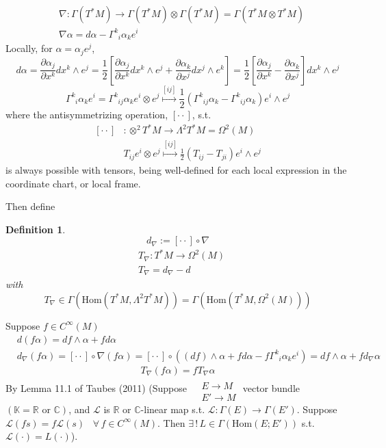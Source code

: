 \documentclass[10pt, twoside]{amsart}
\newtheorem{definition}{Definition}
\begin{document}
\begin{multicols*}{2}
\[
\begin{aligned}
  & \nabla : \Gamma(T^*M) \to \Gamma(T^*M) \otimes \Gamma(T^*M) = \Gamma(T^*M \otimes T^*M) \\
  & \nabla \alpha = d\alpha - \Gamma^k_{ \; \; i } \alpha_k e^i
\end{aligned}
\]
Locally, for $\alpha = \alpha_j e^j$,
\[
d\alpha = \frac{ \partial \alpha_j }{ \partial x^k} dx^k \wedge e^j = \frac{1}{2} \left[ \frac{ \partial \alpha_j}{ \partial x^k} dx^k \wedge e^j + \frac{ \partial \alpha_k}{ \partial x^j} dx^j \wedge e^k \right] = \frac{1}{2} \left[ \frac{ \partial \alpha_j }{ \partial x^k} - \frac{ \partial \alpha_k}{ \partial x^j} \right] dx^k \wedge e^j
\]
\[
\Gamma^k_{ \; \; i} \alpha_k e^i  = \Gamma^k_{ \; \; ij} \alpha_k e^i \otimes e^j \overset{[ij]}{\mapsto} \frac{1}{2} \left( \Gamma^k_{ \; \; ij} \alpha_k - \Gamma^k_{ \; \; ij} \alpha_k \right) e^i \wedge e^j
\]
where the antisymmetrizing operation, $[ \cdot \cdot ]$, s.t.
\[
\begin{aligned}
  [ \cdot \cdot ] & : \otimes^2 T^*M \to \Lambda^2 T^*M = \Omega^2(M) \\
  & T_{ij} e^i \otimes e^j \overset{ [ij]}{\mapsto } \frac{1}{2}(T_{ij} - T_{ji}) e^i \wedge e^j
\end{aligned}
\]
is always possible with tensors, being well-defined for each local expression in the coordinate chart, or local frame.  

Then define
\begin{definition}
  \[
  d_{\nabla} := [ \cdot \cdot ] \circ \nabla
\]
\[
\begin{aligned}
  & T_{\nabla} : T^*M \to \Omega^2(M) \\ 
  & T_{\nabla} = d_{\nabla} - d
\end{aligned}
\]
with 
\[
T_{\nabla} \in \Gamma( \text{Hom}(T^*M, \Lambda^2T^*M)) = \Gamma(\text{Hom}(T^*M, \Omega^2(M) ) )
\]
\end{definition}

Suppose $f\in C^{\infty}(M)$
\[
\begin{aligned}
  & d(f\alpha) = df \wedge \alpha + fd\alpha \\ 
  & d_{\nabla} (f\alpha) = [ \cdot \cdot ]\circ \nabla (f\alpha) = [ \cdot \cdot ]\circ ((df) \wedge \alpha + fd\alpha - f\Gamma^k_{ \; \; i } \alpha_k e^i ) = df \wedge \alpha + f d_{\nabla} \alpha
\end{aligned}
\]
\[
T_{\nabla} (f\alpha ) = fT_{\nabla}\alpha
\]
By Lemma 11.1 of Taubes (2011) \cite{CTaubes2011} (Suppose $\begin{aligned} & \quad \\
  & E \to M \\
  & E' \to M \end{aligned}$ vector bundle $(\mathbb{K} = \mathbb{R} \text{ or } \mathbb{C})$, and $\mathcal{L}$ is $\mathbb{R}$ or $\mathbb{C}$-linear map s.t. $\mathcal{L}: \Gamma(E) \to \Gamma(E')$.  Suppose $\mathcal{L}(fs) = f\mathcal{L}(s)$ \quad \, $\forall \, f \in C^{\infty}(M)$.  Then $\exists \, ! \, L \in \Gamma(\text{Hom}(E;E'))$ s.t. $\mathcal{L}(\cdot ) = L(\cdot )$).  


\end{multicols*}
\end{document}
